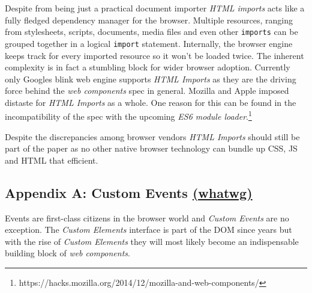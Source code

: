 \documentclass[]{article}
\begin{document}
Despite from being just a practical document importer \emph{HTML
imports} acts like a fully fledged dependency manager for the browser.
Multiple resources, ranging from stylesheets, scripts, documents, media
files and even other \texttt{imports} can be grouped together in a
logical \texttt{import} statement. Internally, the browser engine keeps
track for every imported resource so it won't be loaded twice. The
inherent complexity is in fact a stumbling block for wider browser
adoption. Currently only Googles blink web engine supports \emph{HTML
Imports} as they are the driving force behind the \emph{web components}
spec in general. Mozilla and Apple imposed distaste for \emph{HTML
Imports} as a whole. One reason for this can be found in the
incompatibility of the spec with the upcoming \emph{ES6 module
loader}.\footnote{https://hacks.mozilla.org/2014/12/mozilla-and-web-components/}

Despite the discrepancies among browser vendors \emph{HTML Imports}
should still be part of the paper as no other native browser technology
can bundle up CSS, JS and HTML that efficient.

\subsection{\texorpdfstring{Appendix A: Custom Events
\href{https://dom.spec.whatwg.org/\#interface-customevent}{(whatwg)}}{Appendix A: Custom Events (whatwg)}}\label{appendix-a-custom-events-whatwg}

Events are first-class citizens in the browser world and \emph{Custom
Events} are no exception. The \emph{Custom Elements} interface is part
of the DOM since years but with the rise of \emph{Custom Elements} they
will most likely become an indispensable building block of \emph{web
components}.
\end{document}
